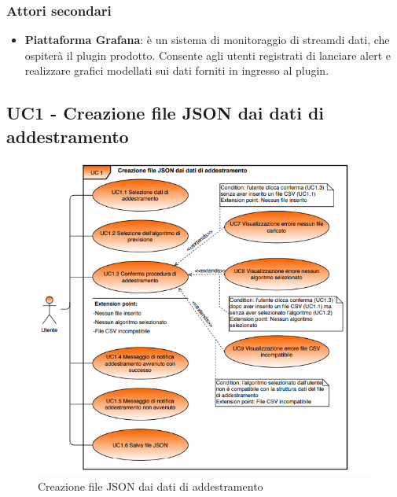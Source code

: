 	\subsubsection{Attori secondari}
	\begin{itemize}
		\item\textbf{Piattaforma Grafana}: è un sistema di monitoraggio di stream\glo di dati, che ospiterà il plugin prodotto. Consente agli utenti registrati di lanciare alert e realizzare grafici modellati sui dati forniti in ingresso al plugin.
	\end{itemize}


	\label{par:UC1}
	\subsection{UC1 - Creazione file JSON dai dati di addestramento}

	\begin{figure}[H]
		\centering
		\includegraphics[scale=0.70]{../Analisi_dei_requisiti/img/Diagrammi_UML/UC1_tool_di_addestramento.png}
		\caption{Creazione file JSON dai dati di addestramento}
	\end{figure}	



